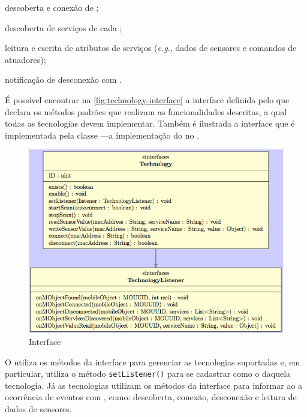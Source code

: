 \begin{alineas}
	\item descoberta e conexão de \smartobjs;
	
	\item descoberta de serviços de cada \smartobjs;

	\item leitura e escrita de atributos de serviços (\textit{e.g.}, dados de sensores e comandos de atuadores);

	\item notificação de desconexão com \smartobjs.
\end{alineas}

É possível encontrar na \autoref{fig:technology-interface} a interface \techinterface definida pelo \stwopa que declara os métodos padrões que realizam as funcionalidades descritas, a qual todas as tecnologias devem implementar. Também é ilustrada a interface \techlistener que é implementada pela classe \stwopaservice---a implementação do \stwopa no \mhub.

\begin{figure}[htb]
	\centering
	\caption{\label{fig:technology-interface}Interface \techinterface}
	\includegraphics[scale=0.6]{img/technology-interface.png}
\end{figure}

O \stwopaservice utiliza os métodos da interface \techinterface para gerenciar as tecnologias suportadas e, em particular, utiliza o método \texttt{setListener(\techlistener)} para se cadastrar como o \listener daquela tecnologia. Já as tecnologias utilizam os métodos da interface \techlistener para informar ao \stwopaservice a ocorrência de eventos com \smartobjs, como: descoberta, conexão, desconexão e leitura de dados de sensores.

